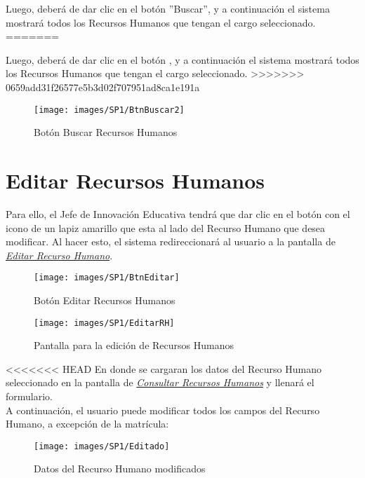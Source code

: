         	Luego, deberá de dar clic en el botón ''Buscar'', y a continuación el sistema mostrará todos los Recursos Humanos que tengan el cargo seleccionado.
=======
        
        	Luego, deberá de dar clic en el botón , y a continuación el sistema mostrará todos los Recursos Humanos que tengan el cargo seleccionado.
>>>>>>> 0659add31f26577e5b3d02f707951ad8ca1e191a
        	\begin{figure}[!hbtp]
        		\centering
        		\hypertarget{buscar}{\texttt{[image: images/SP1/BtnBuscar2]}}
        		\caption{Botón Buscar Recursos Humanos}
        		\label{buscar}
        	\end{figure}

	    \section{Editar Recursos Humanos}

        	Para ello, el Jefe de Innovación Educativa tendrá que dar clic en el botón con el icono de un lapiz amarillo que esta al lado del Recurso Humano que desea modificar. Al hacer esto, el sistema redireccionará al usuario a la pantalla de \hyperlink{editarrh}{\textit{Editar Recurso Humano}}.

        	\begin{figure}[!hbtp]
        		\centering
        		\hypertarget{editar}{\texttt{[image: images/SP1/BtnEditar]}}
        		\caption{Botón Editar Recursos Humanos}
        		\label{editar}
        	\end{figure}

            \begin{figure}[!hbtp]
                \centering
            	\hypertarget{editarrh}{\texttt{[image: images/SP1/EditarRH]}}
            	\caption{Pantalla para la edición de Recursos Humanos}
            	\label{editarrh}
            \end{figure}

<<<<<<< HEAD
            En donde se cargaran los datos del Recurso Humano seleccionado en la pantalla de \hyperlink{consultarrh}{\textit{Consultar Recursos Humanos}} y llenará el formulario.\\

            A continuación, el usuario puede modificar todos los campos del Recurso Humano, a excepción de la matrícula:
            \begin{figure}[!hbtp]
            	\centering
            	\hypertarget{modif}{\texttt{[image: images/SP1/Editado]}}
            	\caption{Datos del Recurso Humano modificados}
            	\label{modif}
            \end{figure}

